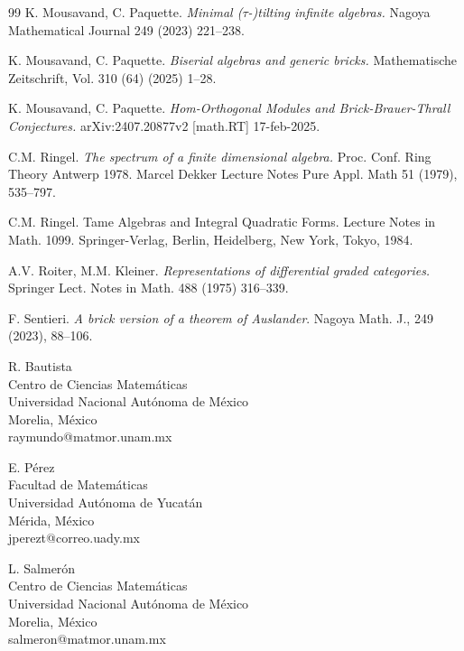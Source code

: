 \documentclass{article}
\theoremstyle{definition}
\begin{document}
\begin{thebibliography}{99}
 K. Mousavand, C. Paquette. \emph{Minimal ($\tau$-)tilting infinite algebras.} Nagoya Mathematical Journal 249 (2023) 221--238. 

 K. Mousavand, C. Paquette. \emph{Biserial algebras and generic bricks.} Mathematische Zeitschrift, Vol. 310 (64) (2025) 1--28. 


 K. Mousavand, C. Paquette. \emph{Hom-Orthogonal Modules  and Brick-Brauer-Thrall Conjectures.}  arXiv:2407.20877v2 [math.RT] 17-feb-2025.

 C.M. Ringel. \textit{The spectrum of a finite dimensional algebra.}
 Proc. Conf. Ring Theory Antwerp 1978. Marcel Dekker Lecture
Notes Pure Appl. Math 51 (1979), 535--797.


 C.M. Ringel. Tame Algebras and Integral Quadratic Forms. Lecture Notes in Math. 1099. Springer-Verlag, 
Berlin, Heidelberg, New York, Tokyo, 1984.

 A.V. Roiter, M.M. Kleiner.  \emph{Representations of differential graded categories.} Springer Lect. Notes in
Math. 488 (1975) 316--339. 

 F. Sentieri. \emph{A brick version of a theorem of Auslander}. Nagoya Math. J., 249 (2023), 88--106. 
  
\end{thebibliography}


\hskip2cm

\vbox{\noindent R. Bautista\\
Centro de Ciencias Matem\'aticas\\
Universidad Nacional Aut\'onoma de M\'exico\\
Morelia, M\'exico\\
raymundo@matmor.unam.mx\\}

\vbox{\noindent E. P\'erez\\
Facultad de Matem\'aticas\\
Universidad Aut\'onoma de Yucat\'an\\
M\'erida, M\'exico\\
jperezt@correo.uady.mx\\}

\vbox{\noindent L. Salmer\'on\\
Centro de Ciencias  Matem\'aticas\\
Universidad Nacional Aut\'onoma de M\'exico\\
Morelia, M\'exico\\
salmeron@matmor.unam.mx\\}

 
\end{document}
